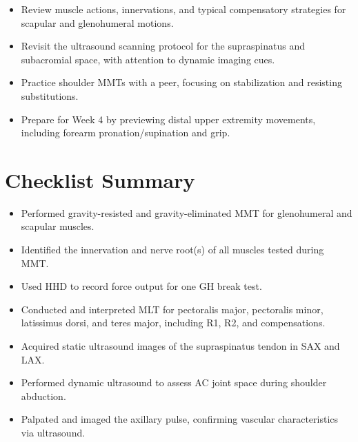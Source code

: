 \begin{itemize}
  \item Review muscle actions, innervations, and typical compensatory strategies for scapular and glenohumeral motions.
  \item Revisit the ultrasound scanning protocol for the supraspinatus and subacromial space, with attention to dynamic imaging cues.
  \item Practice shoulder MMTs with a peer, focusing on stabilization and resisting substitutions.
  \item Prepare for Week 4 by previewing distal upper extremity movements, including forearm pronation/supination and grip.
\end{itemize}

\section*{Checklist Summary}

\begin{itemize}
  \item [$\square$] Performed gravity-resisted and gravity-eliminated MMT for glenohumeral and scapular muscles.
  \item [$\square$] Identified the innervation and nerve root(s) of all muscles tested during MMT.
  \item [$\square$] Used HHD to record force output for one GH break test.
  \item [$\square$] Conducted and interpreted MLT for pectoralis major, pectoralis minor, latissimus dorsi, and teres major, including R1, R2, and compensations.
  \item [$\square$] Acquired static ultrasound images of the supraspinatus tendon in SAX and LAX.
  \item [$\square$] Performed dynamic ultrasound to assess AC joint space during shoulder abduction.
  \item [$\square$] Palpated and imaged the axillary pulse, confirming vascular characteristics via ultrasound.
\end{itemize}

